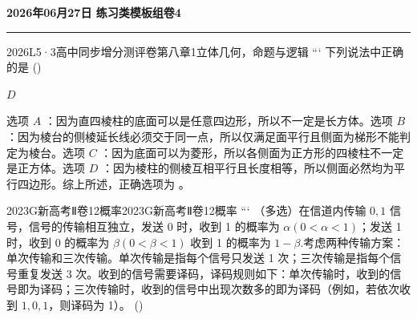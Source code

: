 \documentclass[12pt,UTF-8,a4paper]{ctexart}
\newcommand{\mytitle}{}
\numberwithin{figure}{section}
\theoremstyle{mystyle}
\theoremstyle{mystylekaishu}
\theoremstyle{mystyle}
\numberwithin{xiti}{section}
\begin{document}
\thispagestyle{plain} %
\renewcommand{\mytitle}{2026年06月27日 练习类模板组卷4}

\begin{center}
  {\Huge\bfseries\color{structure} \mytitle}
  \vspace{0.5em}
  
  \textcolor{structure}{\rule{\linewidth}{1.5pt}}
\end{center}
\vspace{1em}


\begin{problem}{2026}{L}{5·3高中同步增分测评卷第八章}{1}{立体几何，命题与逻辑}
```
下列说法中正确的是 (\hspace{1cm})
\begin{choices}
\end{choices}
\end{problem}

\begin{answer}
$D$
\end{answer}

\begin{solutions}
选项 $A$ ：因为直四棱柱的底面可以是任意四边形，所以不一定是长方体。选项 $B$ ：因为棱台的侧棱延长线必须交于同一点，所以仅满足面平行且侧面为梯形不能判定为棱台。选项 $C$ ：因为底面可以为菱形，所以各侧面为正方形的四棱柱不一定是正方体。选项 $D$ ：因为棱柱的侧棱互相平行且长度相等，所以侧面必然均为平行四边形。综上所述，正确选项为 。
\end{solutions}


\begin{problem}{2023}{G}{新高考Ⅱ卷}{12}{概率}{2023}{G}{新高考Ⅱ卷}{12}{概率}
```
（多选）在信道内传输 $0,1$ 信号，信号的传输相互独立，发送 0 时，收到 1 的概率为 $\alpha(0<\alpha<1)$；发送 1 时，收到 0 的概率为 $\beta(0<\beta<1)$ 收到 1 的概率为 $1-\beta$.考虑两种传输方案：单次传输和三次传输。单次传输是指每个信号只发送 1 次；三次传输是指每个信号重复发送 3 次。收到的信号需要译码，译码规则如下：单次传输时，收到的信号即为译码；三次传输时，收到的信号中出现次数多的即为译码（例如，若依次收到 $1,0,1$，则译码为 1）。 (\hspace{1cm})
\begin{choices}
\end{choices}
\end{problem}
\end{document}
